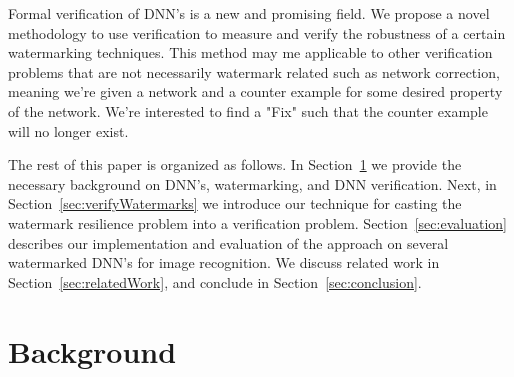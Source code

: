 \documentclass[a4paper]{easychair}
\newcommand{\guy}[1]{\marginpar{\textcolor{orange}{Guy: #1}}}
\begin{document}
Formal verification of DNN's is a new and promising field. We propose a novel methodology to use verification to measure and verify the robustness of a certain watermarking techniques. This method may me applicable to other verification problems that are not necessarily watermark related such as network correction, meaning we're given a network and a counter example for some desired property of the network. We're interested to find a "Fix" such that the counter example will no longer exist.

\guy{Add text about our approach: we implemented in bla bla, worked on
  benchmarks from bla, and obtained amazing results summarized here:
  bla.}

The rest of this paper is organized as follows. In
Section~\ref{sec:background} we provide the necessary background on DNN's, watermarking, and DNN verification. Next, in
Section~\ref{sec:verifyWatermarks} we introduce our technique for
casting the watermark resilience problem into a verification
problem. Section~\ref{sec:evaluation} describes our implementation and evaluation of the approach on several watermarked DNN's for image
recognition. We discuss related work in Section~\ref{sec:relatedWork},
and conclude in Section~\ref{sec:conclusion}.

\section{Background}
\label{sec:background}
\end{document}
